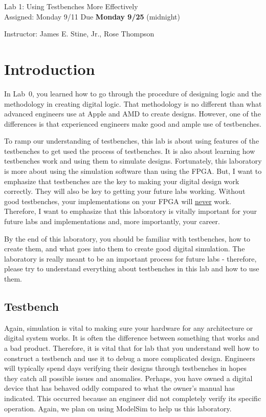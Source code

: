 \documentclass{article}
\newcommand{\myassignment}{Lab 1: Using Testbenches More Effectively}
\newcommand{\myduedate}{Assigned: Monday 9/11 Due \textbf{Monday 9/25} (midnight)}
\newcommand{\myinstructor}{Instructor: James E. Stine, Jr., Rose Thompson}
\begin{document}
\begin{center}
  {\huge \myassignment} \\
  {\large \myduedate} \\
  \begin{flushright}
  \myinstructor \\
  \end{flushright}
\end{center}

\section{Introduction}

In Lab~$0$, you learned how to go through the procedure of
designing logic and the methodology in creating digital logic.  That
methodology is no different than what advanced engineers use at Apple
and AMD to create designs.  However, one of the differences is that experienced
engineers make good and ample use of testbenches.

To ramp our understanding of testbenches, this lab is about using
features of the testbenches to get used the process of
testbenches.  It is also about learning how testbenches work and using
them to simulate designs.  Fortunately, this laboratory is more about using the
simulation software than using the FPGA.  But, I want to emphasize
that testbenches are the key to making your digital design work
correctly.  They will also
be key to getting your future labs working.  Without good
testbenches, your implementations on your FPGA will \underline{never} work.
Therefore, I want to emphasize that this laboratory is vitally important for
your future labs and implementations and, more importantly, your career.

By the end of this laboratory, you should be
familiar with testbenches, how to create them, and what goes into them
to create good digital simulation.  The laboratory is really meant to
be an important process for future labs - therefore, please
try to understand everything about testbenches in this lab and how to
use them.

\subsection{Testbench}

Again, simulation is vital to making sure your hardware for any
architecture or
digital system works.  It is often the difference between something
that works and a bad product.  Therefore, it is
vital that for lab that you understand well how to construct a
testbench and use it to debug a more complicated design.
Engineers will typically spend days verifying their designs through
testbenches in hopes they catch all possible issues and anomalies.
Perhaps, you have owned a digital device that has behaved oddly
compared to what the owner's manual has indicated.  This occurred
because an engineer did not completely verify its specific operation.
Again, we plan on using ModelSim to help us this laboratory.
\end{document}
